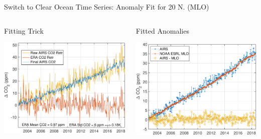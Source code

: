 \documentclass[10pt,t]{beamer}
\begin{document}
\begin{frame}[label={sec:org09faf44}]{\small Switch to Clear Ocean Time Series: \cd Anomaly Fit for 20\textdegree{} N. (MLO)}
\vspace{-0.3in}
\begin{columns}
\begin{column}{0.55\columnwidth}
\begin{block}{\footnotesize Fitting Trick}
\begin{center}
\includegraphics[width=\linewidth]{./Figs/Pdf/raw_co2_vs_era_co2_example_lati28_mlo_lat.pdf}
\end{center}
\end{block}
\end{column}

\begin{column}{0.55\columnwidth}
\begin{block}{\footnotesize Fitted \cd Anomalies}
\begin{center}
\includegraphics[width=\linewidth]{./Figs/Pdf/co2_airs_vs_mlo.pdf}
\end{center}
\end{block}
\end{column}
\end{columns}


\end{frame}
\end{document}
